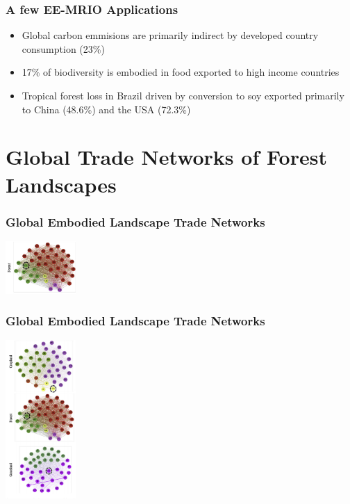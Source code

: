 \documentclass[aspectratio=169]{beamer}
\begin{document}
\begin{frame}
  \frametitle{A few EE-MRIO Applications}
  \begin{itemize}
  \item Global carbon emmisions are primarily indirect by developed
  country consumption (23\%) \cite{LIDDLE201871} \pause
  \item 17\% of biodiversity is embodied in food exported to
  high income countries \cite{CHAUDHARY2016195}  \pause
  \item Tropical forest loss in Brazil driven by conversion to soy
  exported primarily to China (48.6\%) and the USA (72.3\%) \cite{Schaffer-Smith2018}
  \end{itemize}
\end{frame}




\section{Global Trade Networks of Forest Landscapes}
 

\begin{frame}
  \frametitle{Global Embodied Landscape Trade Networks}
    \begin{center}
    \includegraphics[width=0.2\textwidth]{images/Tian_2019_Fig3_inset_inset.png}  
    \end{center}

\end{frame}


\begin{frame}
  \frametitle{Global Embodied Landscape Trade Networks}
  \begin{center}
  \includegraphics[width=0.2\textwidth]{images/Tian_2019_Fig3_inset.png}
  \end{center}
\end{frame}
\end{document}

